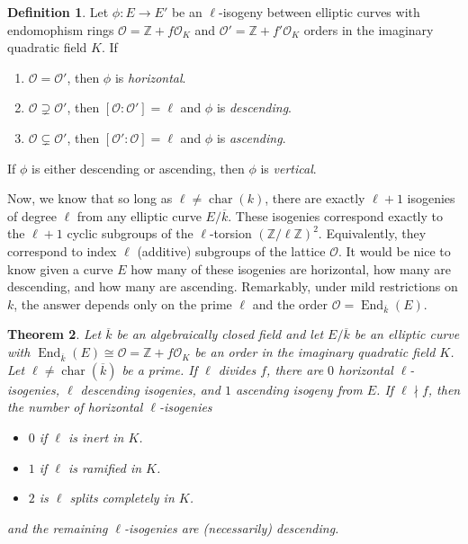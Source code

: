 \documentclass{amsart}
\newtheorem{thm}{Theorem}[section]
\theoremstyle{definition}
\newtheorem{definition}[thm]{Definition}
\theoremstyle{remark}
\numberwithin{equation}{section}
\newcommand{\cO}{\mathcal O}
\newcommand{\bbZ}{\mathbb Z}
\DeclareMathOperator{\Char}{char}
\DeclareMathOperator{\End}{End}
\begin{document}
 \begin{definition}
 Let $\phi: E \to E'$ be an $\ell$-isogeny between elliptic curves with endomophism rings $\cO = \bbZ + f \cO_{K}$ and $\cO' = \bbZ + f' \cO_{K}$ orders in the imaginary quadratic field $K$. If 
 \begin{enumerate}
 \item $\cO = \cO'$, then $\phi$ is \emph{horizontal}.
 \item $\cO \supsetneq \cO'$, then $[\cO : \cO'] = \ell$ and $\phi$ is \emph{descending}.
 \item $\cO \subsetneq \cO'$, then $[\cO' : \cO] = \ell$  and $\phi$ is \emph{ascending}.
 \end{enumerate}
 If $\phi$ is either descending or ascending, then $\phi$ is \emph{vertical}.
 \end{definition}
 
 Now, we know that so long as $\ell \neq \Char(k)$, there are exactly $\ell + 1$ isogenies of degree $\ell$ from any elliptic curve $E/\overline{k}$. These isogenies correspond exactly to the $\ell + 1$ cyclic subgroups of the $\ell$-torsion $(\bbZ/\ell \bbZ)^2$. Equivalently, they correspond to index $\ell$ (additive) subgroups of the lattice $\cO$. It would be nice to know given a curve $E$ how many of these isogenies are horizontal, how many are descending, and how many are ascending. Remarkably, under mild restrictions on $k$, the answer depends only on the prime $\ell$ and the order $\cO = \End_{\overline{k}}(E)$.

\begin{thm} \label{thm:NumbersOfIsogenies}
Let $\overline{k}$ be an algebraically closed field and let $E/\overline{k}$ be an elliptic curve with $\End_{\overline{k}}(E) \cong \cO = \bbZ + f \cO_{K}$ be an order in the imaginary quadratic field $K$. Let $\ell \neq \Char(\overline{k})$ be a prime.
If $\ell$ divides $f$, there are $0$ horizontal $\ell$-isogenies, $\ell$ descending isogenies, and $1$ ascending isogeny from $E$. If $\ell \nmid f$, then the number of horizontal $\ell$-isogenies
\begin{itemize}
\item $0$ if $\ell$ is inert in $K$.
\item $1$ if $\ell$ is ramified in $K$.
\item $2$ is $\ell$ splits completely in $K$.
\end{itemize}
and the remaining $\ell$-isogenies are (necessarily) descending.
\end{thm}
\end{document}
